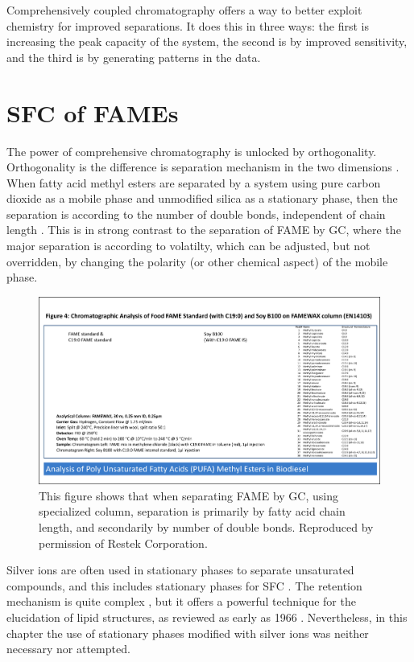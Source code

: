 Comprehensively coupled chromatography offers a way to better exploit chemistry
for improved separations. It does this in three ways: the first is increasing
the peak capacity of the system, the second is by improved sensitivity, and the
third is by generating patterns in the data.


\section{SFC of FAMEs}

The power of comprehensive chromatography is unlocked by orthogonality.
Orthogonality is the difference is separation mechanism in the two dimensions
. When fatty acid methyl esters are separated
by a system using pure carbon dioxide as a mobile phase and unmodified silica as
a stationary phase, then the separation is according to the number of double
bonds, independent of chain length \autocite{Robertson1991, Smith1994,
Smith2001}. This is in strong contrast to the separation of FAME by GC, where
the major separation is according to volatilty, which can be adjusted, but not
overridden, by changing the polarity (or other chemical aspect) of the mobile
phase.

\begin{figure}
\centering
\includegraphics[width=\textwidth]{Figures/FAME-GC.pdf}
\decoRule

\caption[Separation of FAME by GC]{This figure shows that when separating FAME
by GC, using specialized column, separation is primarily by fatty acid chain
length, and secondarily by number of double bonds. Reproduced by permission of Restek Corporation.}

\label{fig:co2fill}
\end{figure}

Silver ions are often used in stationary phases to separate unsaturated
compounds, and this includes stationary phases for SFC \autocite{Sandra2002,
Potgieter2013}. The retention mechanism is quite complex
\autocite{Nikolova-Damyanova2019}, but it offers a powerful technique for the
elucidation of lipid structures, as reviewed as early as 1966
\autocite{Morris1966}. Nevertheless, in this chapter the use of stationary
phases modified with silver ions was neither necessary nor attempted.

